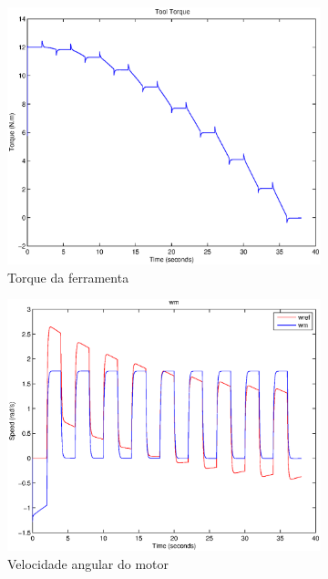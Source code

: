 \documentclass{article}
\begin{document}
\begin{figure}[H]
\begin{subfigure}{0.32\textwidth}
		\includegraphics[width=\linewidth]{matlab/t6}
		\caption{Torque da ferramenta}
	\end{subfigure}
	\begin{subfigure}{0.32\textwidth}
		\includegraphics[width=\linewidth]{matlab/wm6}
		\caption{Velocidade angular do motor}
	\end{subfigure}
	\begin{subfigure}{0.32\textwidth}

\end{subfigure}
\end{figure}
\end{document}
